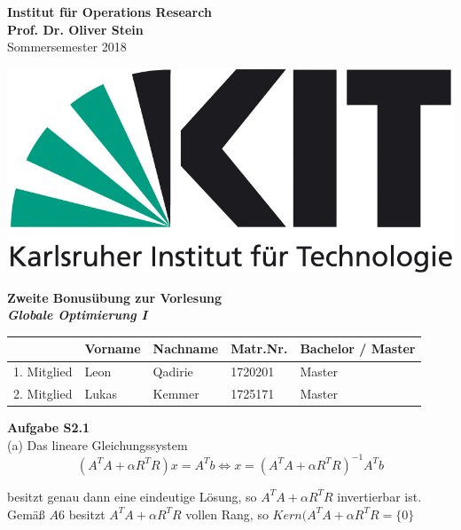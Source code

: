 \documentclass[ngerman, a4paper,12pt]{article}
\begin{document}
\begin{flushleft}
\vspace*{-100pt}
\textbf{Institut f\"ur Operations Research \\
Prof. Dr. Oliver Stein \\}
Sommersemester 2018
\vspace*{15pt}
\end{flushleft}

\begin{flushright}
\vspace*{-80pt}
\includegraphics[scale=0.5]{kit_logo}
\vspace*{15pt}
\end{flushright}

\begin{center}
\textbf{Zweite Bonusübung zur Vorlesung \\
\emph{Globale Optimierung I}}        
\end{center}

\begin{table}[h]
	\centering
	\begin{tabularx}{\textwidth}{X X X X X}
		 & Vorname & Nachname & Matr.Nr. & Bachelor / Master \\
		\toprule
		1. Mitglied & Leon & Qadirie & 1720201 &  Master\\
		2. Mitglied & Lukas & Kemmer & 1725171 &  Master\\
		\bottomrule
	\end{tabularx}
\end{table}
\textbf{Aufgabe S2.1} \\

(a) Das lineare Gleichungssystem
\begin{equation}
  (A^TA+\alpha R^TR)x=A^Tb \Leftrightarrow x=(A^TA+\alpha R^TR)^{-1}A^Tb
\end{equation}

besitzt genau dann eine eindeutige Lösung, so $A^TA+\alpha R^TR$ invertierbar ist. \newline
Gemäß $A6$ besitzt $A^TA+\alpha R^TR$ vollen Rang, so $Kern(A^TA+\alpha R^TR=\{0\}$
\end{document}
